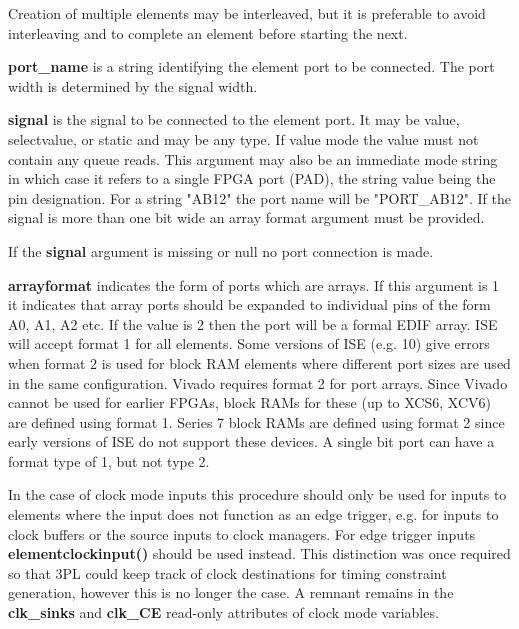         Creation of multiple elements may be interleaved, but it is preferable to
        avoid interleaving and to complete an element before starting the next.
        
        {\bf port\_name} is a string identifying the element port to be
        connected. The port width is determined by the signal width.

        
        {\bf signal} is the signal to be connected to the element port. It may be
        value, selectvalue, or static and may be any type. If value mode the value
        must not contain any queue reads. This argument may also be an immediate mode
        string in which case it refers to a single FPGA port (PAD), the string value
        being the pin designation. For a string "AB12" the port name will be
        "PORT\_AB12". If the signal is more than one bit wide an array format
        argument must be provided.

        If the {\bf signal} argument is missing or null no port connection is
        made.
               
        {\bf arrayformat} indicates the form of ports which are arrays.
        If this argument is 1 it indicates that array ports should be
        expanded to individual pins of the form A0, A1, A2 etc. If the value
        is 2 then the port will be a formal EDIF array. ISE will accept format
        1 for all elements. Some versions of ISE (e.g. 10) give errors when
        format 2 is used for block RAM elements where different port sizes
        are used in the same configuration. Vivado requires format 2 for port
        arrays. Since Vivado cannot be used for earlier FPGAs, block RAMs for
        these (up to XCS6, XCV6) are defined using format 1. Series 7 block RAMs
        are defined using format 2 since early versions of ISE do not support
        these devices. A single bit port can have a format type of 1, but not
        type 2.
        
        In the case of clock mode inputs this procedure should only be used for
        inputs to elements where the input does not function as an edge trigger, e.g.
        for inputs to clock buffers or the source inputs to clock managers. For edge
        trigger inputs {\bf elementclockinput()}  should
        be used instead. This distinction was once required so that 3PL could keep
        track of clock destinations for timing constraint generation, however this
        is no longer the case. A remnant remains in the {\bf clk\_sinks} and
        {\bf clk\_CE} read-only attributes of clock mode variables.

